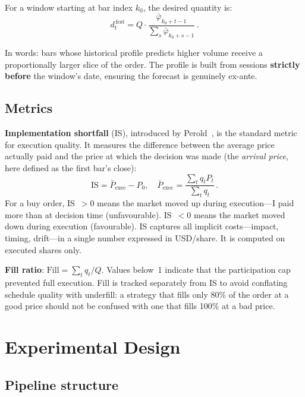 \documentclass[10pt,twocolumn]{article}
\begin{document}
For a window starting at bar index $k_0$, the desired quantity is:
\begin{equation}
d_t^{\,\text{fcst}} = Q \cdot \frac{\bar\varphi_{k_0+t-1}}{\sum_{s}\bar\varphi_{k_0+s-1}}\,.
\end{equation}

In words: bars whose historical profile predicts higher volume receive a proportionally larger slice of the order. The profile is built from sessions \textbf{strictly before} the window's date, ensuring the forecast is genuinely ex-ante.

\subsection{Metrics}

\textbf{Implementation shortfall} (IS), introduced by Perold~\cite{perold1988}, is the standard metric for execution quality. It measures the difference between the average price actually paid and the price at which the decision was made (the \emph{arrival price}, here defined as the first bar's close):
\begin{equation}
\text{IS} = \bar{P}_{\text{exec}} - P_0, \quad \bar{P}_{\text{exec}} = \frac{\sum_t q_t P_t}{\sum_t q_t}\,.
\label{eq:IS}
\end{equation}
For a buy order, IS~$> 0$ means the market moved up during execution---I paid more than at decision time (unfavourable). IS~$< 0$ means the market moved down during execution (favourable). IS captures all implicit costs---impact, timing, drift---in a single number expressed in USD/share. It is computed on executed shares only.

\textbf{Fill ratio}: $\text{Fill} = \sum_t q_t / Q$. Values below~1 indicate that the participation cap prevented full execution. Fill is tracked separately from IS to avoid conflating schedule quality with underfill: a strategy that fills only 80\% of the order at a good price should not be confused with one that fills 100\% at a bad price.


\section{Experimental Design}

\subsection{Pipeline structure}
\end{document}
